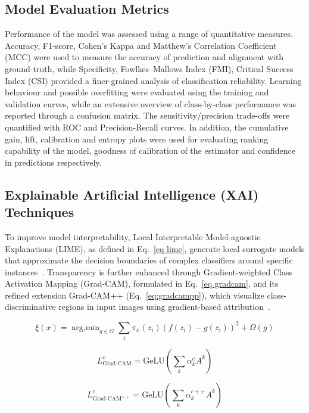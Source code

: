 \documentclass{styles/svproc}
\begin{document}
\subsection{Model Evaluation Metrics}
Performance of the model was assessed using a range of quantitative measures. Accuracy, F1-score, Cohen’s Kappa and Matthew's Correlation Coefficient (MCC) were used to measure the accuracy of prediction and alignment with ground-truth, while Specificity, Fowlkes–Mallows Index (FMI), Critical Success Index (CSI) provided a finer-grained analysis of classification reliability. Learning behaviour and possible overfitting were evaluated using the training and validation curves, while an extensive overview of class-by-class performance was reported through a confusion matrix. The sensitivity/precision trade-offs were quantified with ROC and Precision-Recall curves. In addition, the cumulative gain, lift, calibration and entropy plots were used for evaluating ranking capability of the model, goodness of calibration of the estimator and confidence in predictions respectively.



\subsection{Explainable Artificial Intelligence (XAI) Techniques}
To improve model interpretability, Local Interpretable Model-agnostic Explanations (LIME), as defined in Eq.~\ref{eq lime}, generate local surrogate models that approximate the decision boundaries of complex classifiers around specific instances~\cite{lime}. Transparency is further enhanced through Gradient-weighted Class Activation Mapping (Grad-CAM), formulated in Eq.~\ref{eq gradcam}, and its refined extension Grad-CAM++ (Eq.~\ref{eq:gradcampp}), which visualize class-discriminative regions in input images using gradient-based attribution~\cite{gradcam, gradcampp}.

\begingroup \small

\begin{equation} \label{eq lime} \xi(x) = \mathop{\mathrm{arg,min}}_{g \in G} \sum_i \pi_x(z_i) (f(z_i) - g(z_i))^2 + \Omega(g) \end{equation}

\begin{equation} \label{eq gradcam} L_{\mathrm{Grad\text{-}CAM}}^c = \mathrm{GeLU}\left(\sum_k \alpha_k^c A^k \right) \end{equation}

\begin{equation} \label{eq:gradcampp} L_{\mathrm{Grad\text{-}CAM^{++}}}^c = \mathrm{GeLU}\left(\sum_k \alpha_k^{c++} A^k \right) \end{equation} \endgroup
\end{document}
